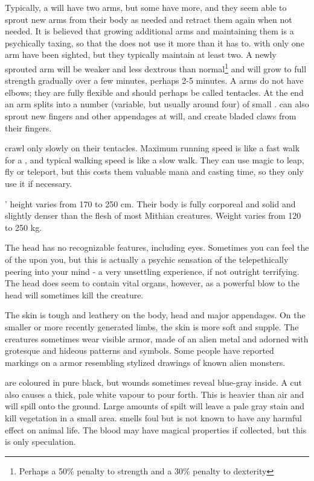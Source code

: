 Typically, a \bane{} will have two arms, but some have more, and they seem able to sprout new arms from their body as needed and retract them again when not needed. It is believed that growing additional arms and maintaining them is a psychically taxing, so that the \bane{} does not use it more than it has to. \Banes{} with only one arm have been sighted, but they typically maintain at least two. A newly sprouted arm will be weaker and less dextrous than normal\footnote{Perhaps a 50\% penalty to strength and a 30\% penalty to dexterity} and will grow to full strength gradually over a few minutes, perhaps 2-5 minutes. A \banez{} arms do not have elbows; they are fully flexible and should perhaps be called tentacles. At the end an arm splits into a number (variable, but usually around four) of small . \Banes{} can also sprout new fingers and other appendages at will, and create bladed claws from their fingers. 

\Banes{} crawl only slowly on their tentacles. Maximum running speed is like a fast walk for a \human, and typical walking speed is like a slow walk. They can use magic to leap, fly or teleport, but this costs them valuable mana and casting time, so they only use it if necessary. 

\Banes{}' height varies from 170 to 250 cm. Their body is fully corporeal and solid and slightly denser than the flesh of most Mithian creatures. Weight varies from 120 to 250 kg. 

The head has no recognizable features, including eyes. Sometimes you can feel the  of the \bane{} upon you, but this is actually a psychic sensation of the \bane{} telepethically peering into your mind - a very unsettling experience, if not outright terrifying. The \banez{} head does seem to contain vital organs, however, as a powerful blow to the head will sometimes kill the creature. 

The \banez{} skin is tough and leathery on the body, head and major appendages. On the smaller or more recently generated limbs, the skin is more soft and supple. The creatures sometimes wear visible armor, made of an alien metal and adorned with grotesque and hideous patterns and symbols. Some people have reported markings on a \banez{} armor resembling stylized drawings of known alien monsters. 

\Banes{} are coloured in pure black, but wounds sometimes reveal blue-gray  inside. A cut also causes a thick, pale white vapour to pour forth. This \quo{\baneblood} is heavier than air and will spill onto the ground. Large amounts of \baneblood{} spilt will leave a pale gray stain and kill vegetation in a small area. \baneblood{} smells foul but is not known to have any harmful effect on animal life. The blood may have magical properties if collected, but this is only speculation. 

